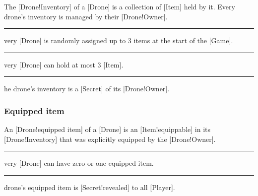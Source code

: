 The [Drone!Inventory] of a [Drone] is a collection of [Item] held by it.
Every drone's inventory is managed by their [Drone!Owner].

\begin{rules}
    \rule{drone.inventory.init} Every [Drone] is randomly assigned up to \(3\) items at the start of the [Game].
    \rule{drone.inventory} Every [Drone] can hold at most \(3\) [Item].
    \rule{drone.inventory.secret} The drone's inventory is a [Secret] of its [Drone!Owner].
\end{rules}

\subsubsection{Equipped item}

An [Drone!equipped item] of a [Drone] is an [Item!equippable] in its [Drone!Inventory] that was explicitly equipped by the [Drone!Owner].

\begin{rules}
    \rule{drone.equip} Every [Drone] can have zero or one equipped item.
    \rule{drone.equip.reveal} A drone's equipped item is [Secret!revealed] to all [Player].
\end{rules}